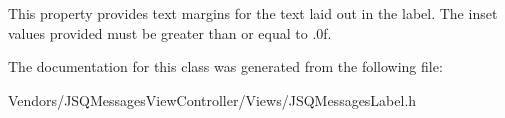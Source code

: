 This property provides text margins for the text laid out in the label. The inset values provided must be greater than or equal to {.\+0f}. 

The documentation for this class was generated from the following file\+:\begin{DoxyCompactItemize}
\item 
Vendors/\+J\+S\+Q\+Messages\+View\+Controller/\+Views/J\+S\+Q\+Messages\+Label.\+h\end{DoxyCompactItemize}
